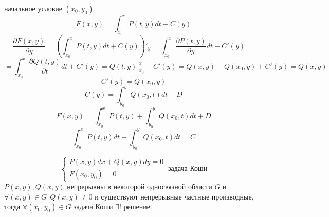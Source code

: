 \begin{block}
  начальное условие $(x_0, y_0)$
  $$
  F(x, y) = \int_{x_0}^x P(t, y)dt + C(y)
  $$
  $$
  \frac{\partial F(x, y)}{\partial y} =
  \left( \int_{x_0}^x P(t, y)dt + C(y) \right)'_y =
  \int_{x_0}^x \frac{\partial P(t, y)}{\partial y} dt + C'(y) =
  $$
  $$
  = \int_{x_0}^x \frac{\partial Q(t, y)}{\partial t} dt + C'(y) =
  Q(t, y)|_{x_0}^x + C'(y) = Q(x, y) - Q(x_0, y) + C'(y) = Q(x, y)
  $$
  $$
  C'(y) = Q(x_0, y)
  $$
  $$
  C(y) = \int_{y_0}^y Q(x_0, t) dt + D
  $$
  $$
  F(x, y) = \int_{x_0}^x P(t, y) + \int_{y_0}^y Q(x_0, t) dt + D
  $$
  $$
  \int_{x_0}^x P(t, y)dt + \int_{y_0}^y Q(x_0, t) dt = C
  $$
\end{block}

\begin{theorem}
  $$
  \left\{
  \begin{array}{l}
    P(x,y)dx + Q(x,y)dy = 0 \\
    F(x_0, y_0) = 0
  \end{array}
  \right. ~ \text{задача Коши}
  $$
  $P(x, y), Q(x, y)$ непрерывны в некоторой односвязной области $G$ и
  $\forall (x,y) \in G ~~ Q(x, y) \not= 0$ и существуют непрерывные частные
  производные, тогда $\forall (x_0, y_0) \in G$ задача Коши
  $\exists !$ решение.
\end{theorem}